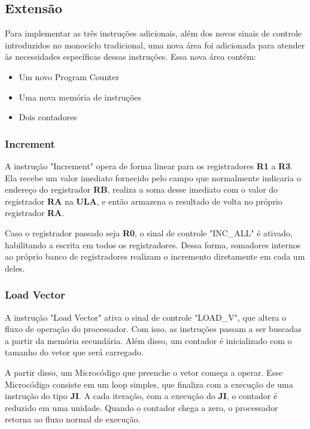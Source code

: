 \documentclass{article}  %
\begin{document}
    \subsection{Extensão}

    Para implementar as três instruções adicionais, além dos novos sinais de controle introduzidos no monociclo tradicional, uma nova área foi adicionada para atender às necessidades específicas dessas instruções. Essa nova área contém:

    \begin{itemize}
      \item Um novo Program Counter
      \item Uma nova memória de instruções
      \item Dois contadores
    \end{itemize}

    \subsubsection{Increment}

    A instrução "Increment" opera de forma linear para os registradores \textbf{R1} a \textbf{R3}. Ela recebe um valor imediato fornecido pelo campo que normalmente indicaria o endereço do registrador \textbf{RB}, realiza a soma desse imediato com o valor do registrador \textbf{RA} na \textbf{ULA}, e então armazena o resultado de volta no próprio registrador \textbf{RA}.

    Caso o registrador passado seja \textbf{R0}, o sinal de controle "INC\_ALL" é ativado, habilitando a escrita em todos os registradores. Dessa forma, somadores internos ao próprio banco de registradores realizam o incremento diretamente em cada um deles.

    \subsubsection{Load Vector}

    A instrução "Load Vector" ativa o sinal de controle "LOAD\_V", que altera o fluxo de operação do processador. Com isso, as instruções passam a ser buscadas a partir da memória secundária. Além disso, um contador é inicializado com o tamanho do vetor que será carregado.

    A partir disso, um Microcódigo que preenche o vetor começa a operar. Esse Microcódigo consiste em um loop simples, que finaliza com a execução de uma instrução do tipo \textbf{JI}. A cada iteração, com a execução do \textbf{JI}, o contador é reduzido em uma unidade. Quando o contador chega a zero, o processador retorna ao fluxo normal de execução.
\end{document}
